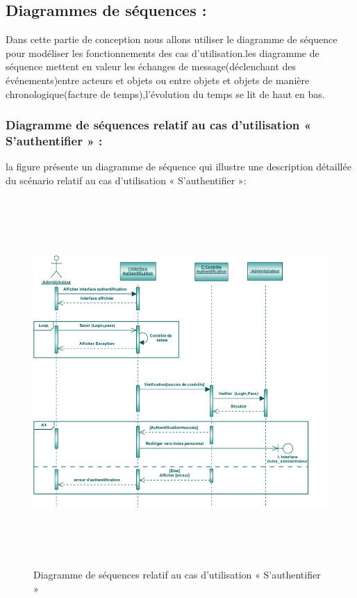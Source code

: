 \documentclass[12 pt ]{report}
\begin{document}
\subsection{Diagrammes de séquences :}
Dans cette partie de conception nous allons utiliser le diagramme de séquence pour modéliser les fonctionnements des cas d'utilisation.les diagramme de séquence mettent en valeur les échanges de message(déclenchant des événements)entre acteurs et objets ou entre objets et objets de manière chronologique(facture de temps),l'évolution du temps se lit de haut en bas.
\newpage
\subsubsection{Diagramme de séquences relatif au cas d’utilisation « S’authentifier » :}
la figure   présente un diagramme de séquence qui illustre une description détaillée du scénario relatif au cas d’utilisation « S’authentifier »: 
\begin{figure}[h]
 \begin{center}
\includegraphics[width= 18 cm ,height=  14cm]{ca.PNG}
\caption{Diagramme de séquences relatif au cas d’utilisation « S’authentifier »}

\end{center}
\end{figure}
\newpage
\end{document}
